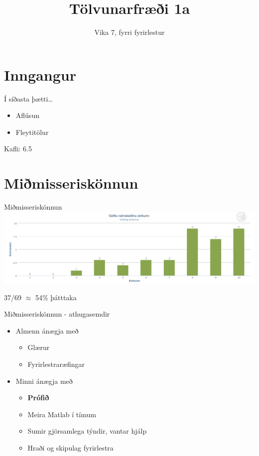 \documentclass{beamer}
\title{Tölvunarfræði 1a}
\subtitle{Vika 7, fyrri fyrirlestur}
\begin{document}
\begin{frame}
\titlepage
\end{frame}

\section{Inngangur}

\begin{frame}{Í síðasta þætti\ldots}
\begin{itemize}
 \item Aflúsun
 \item Fleytitölur
\end{itemize}
Kafli: 6.5
\end{frame}

\section{Miðmisseriskönnun}

\begin{frame}{Miðmisseriskönnun}
\includegraphics[width=\textwidth]{Pics/kennslukonnun-einkunnir}
\begin{center}
37/69 $\approx$ 54\% þátttaka
\end{center}

\end{frame}

\begin{frame}{Miðmisseriskönnun - athugasemdir}
\pause
\begin{itemize}
 \item Almenn ánægja með
 \begin{itemize}
  \item Glærur
  \item Fyrirlestraræfingar
 \end{itemize}
 \pause
 \item Minni ánægja með
 \begin{itemize}
  \item \textbf{Prófið}
  \item Meira Matlab í tímum
  \item Sumir gjörsamlega týndir, vantar hjálp
  \item Hraði og skipulag fyrirlestra
 \end{itemize}
\end{itemize}
\end{frame}
\end{document}
